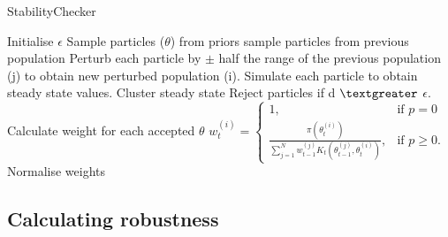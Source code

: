\begin{algorithm}
	\label{alg:StabilityChecker}
  \caption{StabilityChecker}
 \begin{algorithmic}[1]
    \Statex
	\State Initialise $\epsilon$ 
		\State Sample particles ($\theta$) from priors
		\Else
			\State sample particles from previous population
			\State  Perturb each particle by $\pm$ half the range of the previous population (j) to obtain new perturbed population (i).
	\EndIf
    \State Simulate each particle to obtain steady state values.
    \State Cluster steady state
	\State Reject particles if d $\textgreater$ $\epsilon$.
    \State Calculate weight for each accepted $\theta$
	\State $w_{t}^{(i)} = \begin{cases} 1, & \mbox{if } p = 0 \\\frac{\pi(\theta_{t}^{(i)})}{\sum_{j=1}^N w_{t-1}^{(j)} K_{t}(\theta_{t-1}^{(j)}, \theta_{t}^{(i)})}, & \mbox{if } p \geq  0. \end{cases}$
	\State Normalise weights
	 
  \end{algorithmic}
\end{algorithm}

\newpage
\subsection{Calculating robustness}

